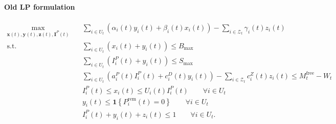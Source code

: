 \documentclass[11pt]{article}
\begin{document}
\clearpage

\paragraph{Old LP formulation}
\begin{subequations}
\label{eq:myopic_ilp_old}
\begin{align}
    \max_{\mathbf{x}(t),\mathbf{y}(t),\mathbf{z}(t),\mathbf{I}^P(t)}
    \quad
    &\sum_{i \in U_t}
    \left(
        \alpha_i(t)y_i(t)
        +
        \beta_i(t)x_i(t)
    \right)
    -
    \sum_{i \in \mathcal{Z}_t}
    \gamma_i(t)z_i(t)
    \label{eq:myopic_ilp_obj_old}\\
    \text{s.t.}\quad
    &\sum_{i \in U_t}
    \left(
        x_i(t)+y_i(t)
    \right)
    \le B_{\max}
    \label{eq:p_compute_old}\\
    &\sum_{i \in U_t}
    \left(
        I_i^P(t)+y_i(t)
    \right)
    \le S_{\max}
    \label{eq:p_concurrency_old}\\
    &\sum_{i \in U_t}
    \left(
        a_i^P(t)I_i^P(t)
        +
        c_i^D(t)y_i(t)
    \right)
    -
    \sum_{i \in \mathcal{Z}_t}
    c_i^Z(t)z_i(t)
    \le
    M_t^{\mathrm{free}}-W_t
    \label{eq:p_memory_old}\\
    &I_i^P(t)
    \le
    x_i(t)
    \le
    U_i(t)I_i^P(t)
    \qquad
    \forall i \in U_t
    \label{eq:p_chunked_old}\\
    &y_i(t)
    \le
    \mathbf{1}
    \left\{
        P_i^{\mathrm{rem}}(t)=0
    \right\}
    \qquad
    \forall i \in U_t
    \label{eq:p_causality_old}\\
    &I_i^P(t)+y_i(t)+z_i(t)
    \le 1
    \qquad
    \forall i \in U_t.
    \label{eq:p_mutex_old}
\end{align}
\end{subequations}

\clearpage



% 
\end{document}

